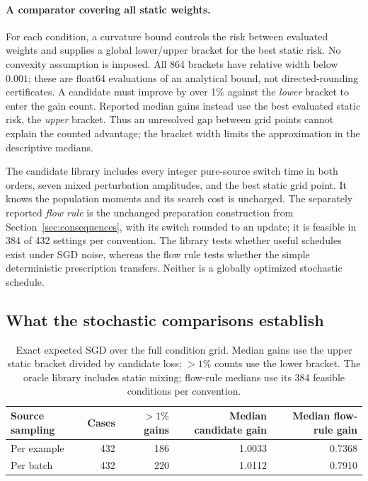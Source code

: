 \documentclass{article}
\theoremstyle{remark}\newtheorem{remark}[theorem]{Remark}
\begin{document}
\paragraph{A comparator covering all static weights.}
For each condition, a curvature bound controls the risk between evaluated weights and supplies a global lower/upper bracket for the best static risk. No convexity assumption is imposed. All 864 brackets have relative width below $0.001$; these are float64 evaluations of an analytical bound, not directed-rounding certificates. A candidate must improve by over 1\% against the \emph{lower} bracket to enter the gain count. Reported median gains instead use the best evaluated static risk, the \emph{upper} bracket. Thus an unresolved gap between grid points cannot explain the counted advantage; the bracket width limits the approximation in the descriptive medians.

The candidate library includes every integer pure-source switch time in both orders, seven mixed perturbation amplitudes, and the best static grid point. It knows the population moments and its search cost is uncharged. The separately reported \emph{flow rule} is the unchanged preparation construction from Section~\ref{sec:consequences}, with its switch rounded to an update; it is feasible in 384 of 432 settings per convention. The library tests whether useful schedules exist under SGD noise, whereas the flow rule tests whether the simple deterministic prescription transfers. Neither is a globally optimized stochastic schedule.

\subsection{What the stochastic comparisons establish}
\begin{table}[t]
\centering\small
\caption{Exact expected SGD over the full condition grid. Median gains use the upper static bracket divided by candidate loss; $>1\%$ counts use the lower bracket. The oracle library includes static mixing; flow-rule medians use its 384 feasible conditions per convention.}\label{tab:mainmoments}
\begin{tabular}{lrrrr}\toprule
Source sampling & Cases & $>1\%$ gains & Median candidate gain & Median flow-rule gain\\\midrule
Per example &432&186&1.0033&0.7368\\
Per batch &432&220&1.0112&0.7910\\\bottomrule
\end{tabular}
\end{table}
\end{document}

